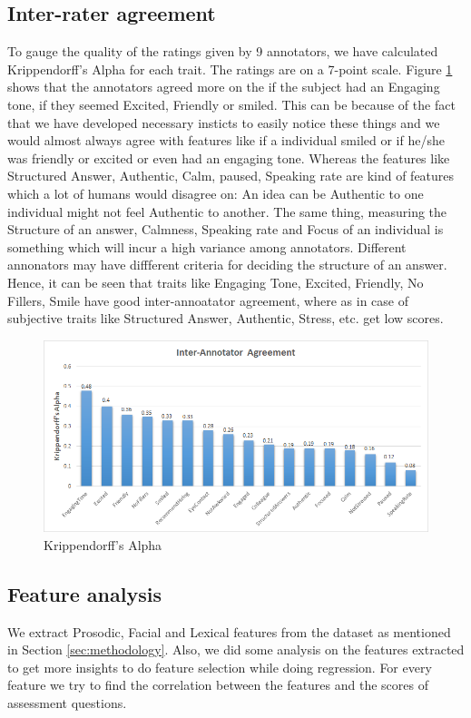 \documentclass[11pt]{article}
\begin{document}
\subsection{Inter-rater agreement}
To gauge the quality of the ratings given by 9 annotators, we have calculated Krippendorff’s Alpha for each trait. The ratings are on a 7-point scale. Figure \ref{fig:interrater} shows that the annotators agreed more on the if the subject had an Engaging tone, if they seemed Excited, Friendly or smiled. This can be because of the fact that we have developed necessary insticts to easily notice these things and we would almost always agree with features like if a individual smiled or if he/she was friendly or excited or even had an engaging tone. Whereas the features like Structured Answer, Authentic, Calm, paused, Speaking rate are kind of features which a lot of humans would disagree on: An idea can be Authentic to one individual might not feel Authentic to another. The same thing, measuring the Structure of an answer, Calmness, Speaking rate and Focus of an individual is something which will incur a high variance among annotators. Different annonators may have diffferent criteria for deciding the structure of an answer. Hence, it can be seen that traits like Engaging Tone, Excited, Friendly, No Fillers, Smile have good inter-annoatator agreement, where as in case of subjective traits like Structured Answer, Authentic, Stress, etc. get low scores.

\begin{figure}[h!]
\begin{center}
\includegraphics[width=1\columnwidth]{figures/k-alpha scores.png}
\caption{Krippendorff's Alpha}
\label{fig:interrater}
\end{center}
\end{figure}

\subsection{Feature analysis}
\label{sec:feature_analysis}
We extract Prosodic, Facial and Lexical features from the dataset as mentioned in Section \ref{sec:methodology}. Also, we did some analysis on the features extracted to get more insights to do feature selection while doing regression. For every feature we try to find the correlation between the features and the scores of assessment questions.
\end{document}

